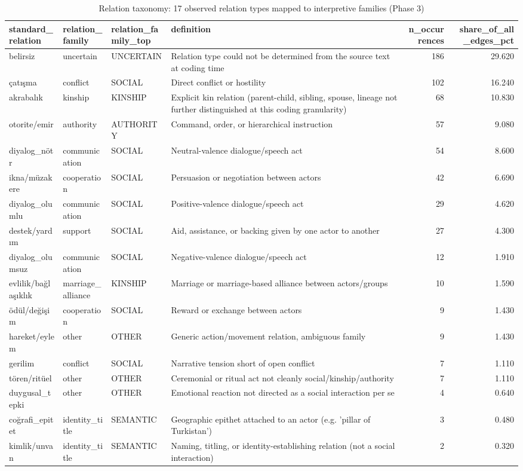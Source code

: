\begin{table}
\caption{Relation taxonomy: 17 observed relation types mapped to interpretive families (Phase 3)}
\label{tab:t02_relation_taxonomy}
\begin{tabular}{llllrr}
\toprule
standard_relation & relation_family & relation_family_top & definition & n_occurrences & share_of_all_edges_pct \\
\midrule
belirsiz & uncertain & UNCERTAIN & Relation type could not be determined from the source text at coding time & 186 & 29.620 \\
çatışma & conflict & SOCIAL & Direct conflict or hostility & 102 & 16.240 \\
akrabalık & kinship & KINSHIP & Explicit kin relation (parent-child, sibling, spouse, lineage not further distinguished at this coding granularity) & 68 & 10.830 \\
otorite/emir & authority & AUTHORITY & Command, order, or hierarchical instruction & 57 & 9.080 \\
diyalog_nötr & communication & SOCIAL & Neutral-valence dialogue/speech act & 54 & 8.600 \\
ikna/müzakere & cooperation & SOCIAL & Persuasion or negotiation between actors & 42 & 6.690 \\
diyalog_olumlu & communication & SOCIAL & Positive-valence dialogue/speech act & 29 & 4.620 \\
destek/yardım & support & SOCIAL & Aid, assistance, or backing given by one actor to another & 27 & 4.300 \\
diyalog_olumsuz & communication & SOCIAL & Negative-valence dialogue/speech act & 12 & 1.910 \\
evlilik/bağlaşıklık & marriage_alliance & KINSHIP & Marriage or marriage-based alliance between actors/groups & 10 & 1.590 \\
ödül/değişim & cooperation & SOCIAL & Reward or exchange between actors & 9 & 1.430 \\
hareket/eylem & other & OTHER & Generic action/movement relation, ambiguous family & 9 & 1.430 \\
gerilim & conflict & SOCIAL & Narrative tension short of open conflict & 7 & 1.110 \\
tören/ritüel & other & OTHER & Ceremonial or ritual act not cleanly social/kinship/authority & 7 & 1.110 \\
duygusal_tepki & other & OTHER & Emotional reaction not directed as a social interaction per se & 4 & 0.640 \\
coğrafi_epitet & identity_title & SEMANTIC & Geographic epithet attached to an actor (e.g. 'pillar of Turkistan') & 3 & 0.480 \\
kimlik/unvan & identity_title & SEMANTIC & Naming, titling, or identity-establishing relation (not a social interaction) & 2 & 0.320 \\
\bottomrule
\end{tabular}
\end{table}
